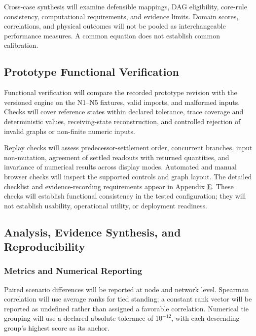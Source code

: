 Cross-case synthesis will examine defensible mappings, DAG eligibility,
core-rule consistency, computational requirements, and evidence limits.
Domain scores, correlations, and physical outcomes will not be pooled
as interchangeable performance measures. A common equation does not
establish common calibration.

\subsection{Prototype Functional Verification}\label{prototype-verification}

Functional verification will compare the recorded prototype revision with
the versioned engine on the N1--N5 fixtures, valid imports, and malformed
inputs. Checks will cover reference states within declared tolerance, trace coverage
and deterministic values, receiving-state reconstruction, and controlled
rejection of invalid graphs or non-finite numeric inputs.

Replay checks will assess predecessor-settlement order, concurrent
branches, input non-mutation, agreement of settled readouts with returned
quantities, and invariance of numerical results across display modes.
Automated and manual browser checks will inspect the supported controls and
graph layout. The detailed checklist and evidence-recording requirements
appear in Appendix
\hyperref[app:prototype-contract]{E}. These
checks will establish functional consistency in the tested configuration; they
will not establish usability, operational utility, or deployment readiness.

\subsection{Analysis, Evidence Synthesis, and Reproducibility}
\label{analysis-reproducibility}

\subsubsection{Metrics and Numerical Reporting}

Paired scenario differences will be reported at node and network level.
Spearman correlation will use average ranks for tied standing; a constant
rank vector will be reported as undefined rather than assigned a favorable
correlation. Numerical tie grouping will use a declared absolute tolerance
of $10^{-12}$, with each descending group's highest score as its anchor.

